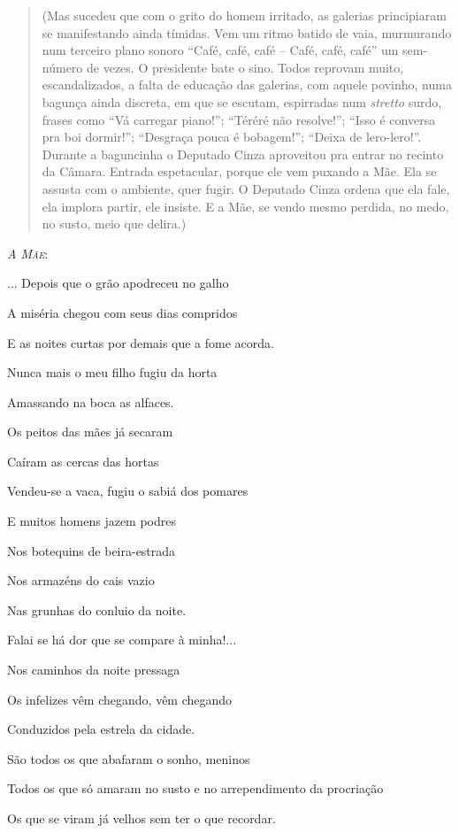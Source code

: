 \begin{quote}
(Mas sucedeu que com o grito do homem irritado, as galerias principiaram
se manifestando ainda tímidas. Vem um ritmo batido de vaia, murmurando
num terceiro plano sonoro ``Café, café, café -- Café, café, café'' um
sem-número de vezes. O presidente bate o sino. Todos reprovam muito,
escandalizados, a falta de educação das galerias, com aquele povinho,
numa bagunça ainda discreta, em que se escutam, espirradas num
\emph{stretto} surdo, frases como ``Vá carregar piano!''; ``Téréré não
resolve!''; ``Isso é conversa pra boi dormir!''; ``Desgraça pouca é
bobagem!''; ``Deixa de lero-lero!''. Durante a baguncinha o Deputado
Cinza aproveitou pra entrar no recinto da Câmara. Entrada espetacular,
porque ele vem puxando a Mãe. Ela se assusta com o ambiente, quer fugir.
O Deputado Cinza ordena que ela fale, ela implora partir, ele insiste. E
a Mãe, se vendo mesmo perdida, no medo, no susto, meio que delira.)
\end{quote}

\emph{\textsc{A Mãe}}:

... Depois que o grão apodreceu no galho

A miséria chegou com seus dias compridos

E as noites curtas por demais que a fome acorda.

Nunca mais o meu filho fugiu da horta

Amassando na boca as alfaces.

Os peitos das mães já secaram

Caíram as cercas das hortas

Vendeu-se a vaca, fugiu o sabiá dos pomares

E muitos homens jazem podres

Nos botequins de beira-estrada

Nos armazéns do cais vazio

Nas grunhas do conluio da noite.

Falai se há dor que se compare à minha!...

Nos caminhos da noite pressaga

Os infelizes vêm chegando, vêm chegando

Conduzidos pela estrela da cidade.

São todos os que abafaram o sonho, meninos

Todos os que só amaram no susto e no arrependimento da procriação

Os que se viram já velhos sem ter o que recordar.

